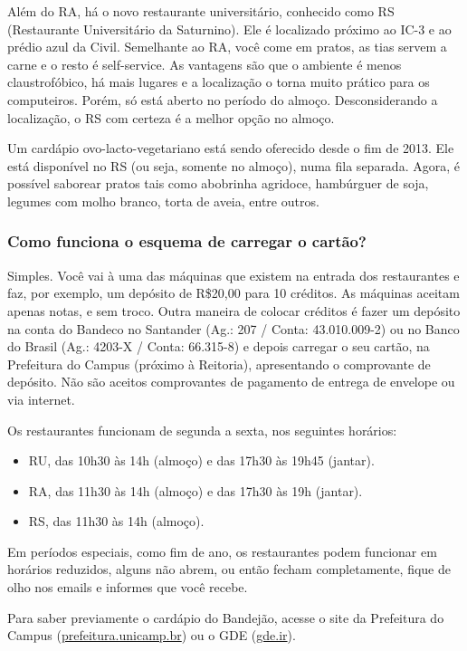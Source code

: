 Além do RA, há o novo restaurante universitário, conhecido como RS (Restaurante
Universitário da Saturnino). Ele é localizado próximo ao IC-3 e ao prédio azul
da Civil. Semelhante ao RA, você come em pratos, as tias servem a carne e o
resto é self-service. As vantagens são que o ambiente é menos claustrofóbico, há
mais lugares e a localização o torna muito prático para os computeiros. Porém,
só está aberto no período do almoço. Desconsiderando a localização, o RS com
certeza é a melhor opção no almoço.

Um cardápio ovo-lacto-vegetariano está sendo oferecido desde o fim de 2013. Ele
está disponível no RS (ou seja, somente no almoço), numa fila separada. Agora, é
possível saborear pratos tais como abobrinha agridoce, hambúrguer de soja,
legumes com molho branco, torta de aveia, entre outros.

\subsubsection*{Como funciona o esquema de carregar o cartão?}

Simples. Você vai à uma das máquinas que existem na entrada dos restaurantes e
faz, por exemplo, um depósito de R\$20,00 para 10 créditos. As máquinas aceitam
apenas notas, e sem troco. Outra maneira de colocar créditos é fazer um depósito
na conta do Bandeco no Santander (Ag.: 207 / Conta: 43.010.009-2) ou no Banco do
Brasil (Ag.: 4203-X / Conta: 66.315-8) e depois carregar o seu cartão, na
Prefeitura do Campus (próximo à Reitoria), apresentando o comprovante de
depósito. Não são aceitos comprovantes de pagamento de entrega de envelope ou
via internet.

Os restaurantes funcionam de segunda a sexta, nos seguintes horários:

\begin{itemize}
    \item  RU, das 10h30 às 14h (almoço) e das 17h30 às 19h45 (jantar).
    \item  RA, das 11h30 às 14h (almoço) e das 17h30 às 19h (jantar).
    \item  RS, das 11h30 às 14h (almoço).
\end{itemize}

Em períodos especiais, como fim de ano, os restaurantes podem funcionar em
horários reduzidos, alguns não abrem, ou então fecham completamente, fique de
olho nos emails e informes que você recebe.

Para saber previamente o cardápio do Bandejão, acesse o site da Prefeitura do
Campus (\url{prefeitura.unicamp.br}) ou o GDE (\url{gde.ir}).

